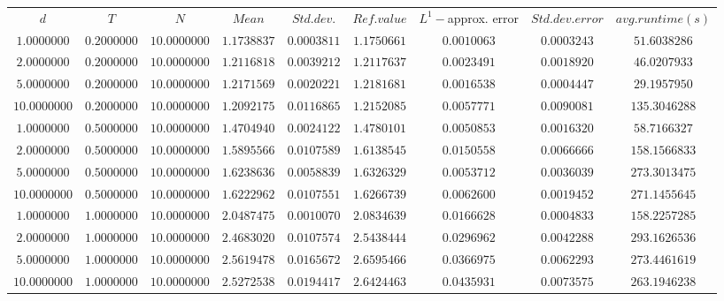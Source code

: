 \begin{tabular}{ccccccccc}
$d$ & $T$ & $N$ & $Mean$ & $Std. dev.$ & $Ref. value$ & $L^1-$approx. error & $Std. dev. error$ & $avg. runtime (s)$\\
$1.0000000$ & $0.2000000$ & $10.0000000$ & $1.1738837$ & $0.0003811$ & $1.1750661$ & $0.0010063$ & $0.0003243$ & $51.6038286$\\
$2.0000000$ & $0.2000000$ & $10.0000000$ & $1.2116818$ & $0.0039212$ & $1.2117637$ & $0.0023491$ & $0.0018920$ & $46.0207933$\\
$5.0000000$ & $0.2000000$ & $10.0000000$ & $1.2171569$ & $0.0020221$ & $1.2181681$ & $0.0016538$ & $0.0004447$ & $29.1957950$\\
$10.0000000$ & $0.2000000$ & $10.0000000$ & $1.2092175$ & $0.0116865$ & $1.2152085$ & $0.0057771$ & $0.0090081$ & $135.3046288$\\
$1.0000000$ & $0.5000000$ & $10.0000000$ & $1.4704940$ & $0.0024122$ & $1.4780101$ & $0.0050853$ & $0.0016320$ & $58.7166327$\\
$2.0000000$ & $0.5000000$ & $10.0000000$ & $1.5895566$ & $0.0107589$ & $1.6138545$ & $0.0150558$ & $0.0066666$ & $158.1566833$\\
$5.0000000$ & $0.5000000$ & $10.0000000$ & $1.6238636$ & $0.0058839$ & $1.6326329$ & $0.0053712$ & $0.0036039$ & $273.3013475$\\
$10.0000000$ & $0.5000000$ & $10.0000000$ & $1.6222962$ & $0.0107551$ & $1.6266739$ & $0.0062600$ & $0.0019452$ & $271.1455645$\\
$1.0000000$ & $1.0000000$ & $10.0000000$ & $2.0487475$ & $0.0010070$ & $2.0834639$ & $0.0166628$ & $0.0004833$ & $158.2257285$\\
$2.0000000$ & $1.0000000$ & $10.0000000$ & $2.4683020$ & $0.0107574$ & $2.5438444$ & $0.0296962$ & $0.0042288$ & $293.1626536$\\
$5.0000000$ & $1.0000000$ & $10.0000000$ & $2.5619478$ & $0.0165672$ & $2.6595466$ & $0.0366975$ & $0.0062293$ & $273.4461619$\\
$10.0000000$ & $1.0000000$ & $10.0000000$ & $2.5272538$ & $0.0194417$ & $2.6424463$ & $0.0435931$ & $0.0073575$ & $263.1946238$\\
\end{tabular}
